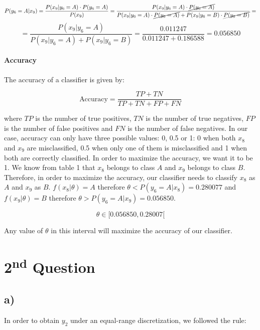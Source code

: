 \documentclass{article}
\begin{document}
\paragraph{}

\[ P(y_6 = A|x_9) = \frac{ P(x_9 | y_6 = A) \cdot P(y_6 = A)}{P(x_9)} = \frac{P(x_9 | y_6 = A) \cdot \cancel{P(y_6 = A)}}{P(x_9 | y_6 = A)\cdot \cancel{P(y_6 = A)} + P(x_9 | y_6 = B)\cdot \cancel{P(y_6 = B)}} = \]
\[ = \frac{P(x_9 | y_6 = A)}{P(x_9 | y_6 = A) + P(x_9 | y_6 = B)} = \frac{0.011247}{0.011247 + 0.186588} = 0.056850\]

\paragraph{Accuracy}

The accuracy of a classifier is given by:

\[ \text{Accuracy} = \frac{TP + TN}{TP + TN + FP + FN} \]

where $TP$ is the number of true positives, $TN$ is the number of true negatives, $FP$ is the number of false positives and $FN$ is the number of false negatives.
In our case, accuracy can only have three possible values: 0, 0.5 or 1: 0 when both $x_8$ and $x_9$ are misclassified, 0.5 when only one of them is misclassified and 1 when both are correctly classified.
In order to maximize the accuracy, we want it to be 1. We know from table 1 that $x_8$ belongs to class $A$ and $x_9$ belongs to class $B$. Therefore, in order to maximize the accuracy, our classifier needs to classify $x_8$ as $A$ and $x_9$ as $B$.
$f(x_8|\theta) = A$ therefore $\theta < P(y_6=A|x_8) = 0.280077$ and $f(x_9|\theta) = B$ therefore $\theta > P(y_6=A|x_9) = 0.056850$.

\[ \theta \in [0.056850, 0.28007[ \]

Any value of $\theta$ in this interval will maximize the accuracy of our classifier.

\newpage

\section*{2\textsuperscript{nd} Question}

\subsection*{a)}

In order to obtain $y_2$ under an equal-range discretization, we followed the rule:
\end{document}
